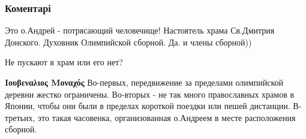  
 
 
 
 
\subsubsection{Коментарі}
\label{sec:09_08_2021.fb.berdnik_miroslava.1.rossia_olimpic_team.cmt}

\begin{itemize}
 
Это о.Андрей - потрясающий человечище! Настоятель храма Св.Дмитрия Донского. Духовник Олимпийской сборной.
Да. и члены сборной))

 
Не пускают в храм или его нет?

\begin{itemize}
 
\textbf{Ιουβεναλιος Μοναχός} Во-первых, передвижение за пределами олимпийской
деревни жестко ограничены. Во-вторых - не так много православных храмов в
Японии, чтобы они были в пределах короткой поездки или пешей дистанции.
В-третьих, это такая часовенка, организованная о.Андреем в месте расположения
сборной.
\end{itemize}

 

\end{itemize}
